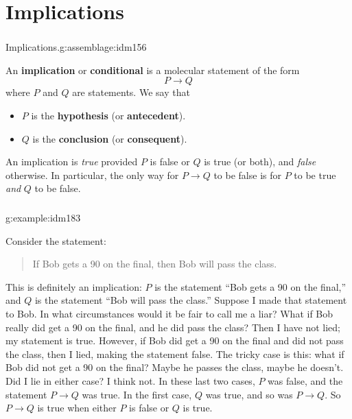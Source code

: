 \documentclass[11pt, compress]{beamer}
\newcommand{\terminology}[1]{\textbf{#1}}\newcommand{\lt}{<}
\newcommand{\imp}{\rightarrow}
\begin{document}
\section{Implications}
\begin{frame}
\frametitle{}
\begin{assemblage}{Implications.}{g:assemblage:idm156}%

An \terminology{implication} or \terminology{conditional} is a molecular statement of the form%
\begin{equation*}
P \imp Q
\end{equation*}
where \(P\) and \(Q\) are statements. We say that\begin{itemize}
\item{}\(P\) is the \terminology{hypothesis} (or \terminology{antecedent}).

\item{}\(Q\) is the \terminology{conclusion} (or \terminology{consequent}).
\end{itemize}
An implication is \emph{true} provided \(P\) is false or \(Q\) is true (or both), and \emph{false} otherwise. In particular, the only way for \(P \imp Q\) to be false is for \(P\) to be true \emph{and} \(Q\) to be false.\end{assemblage}
\end{frame}
 
\begin{frame}
\frametitle{}
\begin{example}{}{g:example:idm183}%

Consider the statement:\begin{quote}%

If Bob gets a 90 on the final, then Bob will pass the class.\end{quote}

This is definitely an implication: \(P\) is the statement ``Bob gets a 90 on the final,'' and \(Q\) is the statement ``Bob will pass the class.''
Suppose I made that statement to Bob. In what circumstances would it be fair to call me a liar? What if Bob really did get a 90 on the final, and he did pass the class? Then I have not lied; my statement is true. However, if Bob did get a 90 on the final and did not pass the class, then I lied, making the statement false. The tricky case is this: what if Bob did not get a 90 on the final? Maybe he passes the class, maybe he doesn't. Did I lie in either case? I think not. In these last two cases, \(P\) was false, and the statement \(P \imp Q\) was true. In the first case, \(Q\) was true, and so was \(P \imp Q\). So \(P \imp Q\) is true when either \(P\) is false or \(Q\) is true.\end{example}
\end{frame}
 
\end{document}
